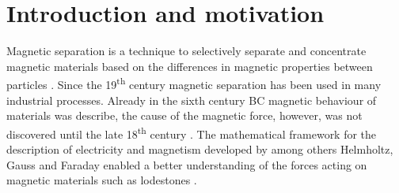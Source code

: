 
\chapter{Introduction and motivation}
\label{ch:Introduction}
Magnetic separation is a technique to selectively separate and concentrate magnetic materials based on the differences in magnetic properties between particles \cite{ge2017magnetic}. Since the 19\textsuperscript{th} century magnetic separation has been used in many industrial processes. Already in the sixth century BC magnetic behaviour of materials was describe, the cause of the magnetic force, however, was not discovered until the late 18\textsuperscript{th} century \cite{livingston1996driving}. The mathematical framework for the description of electricity and magnetism developed by among others Helmholtz, Gauss and Faraday enabled a better understanding of the forces acting on magnetic materials such as lodestones \cite{yavuz2009magnetic}. 

